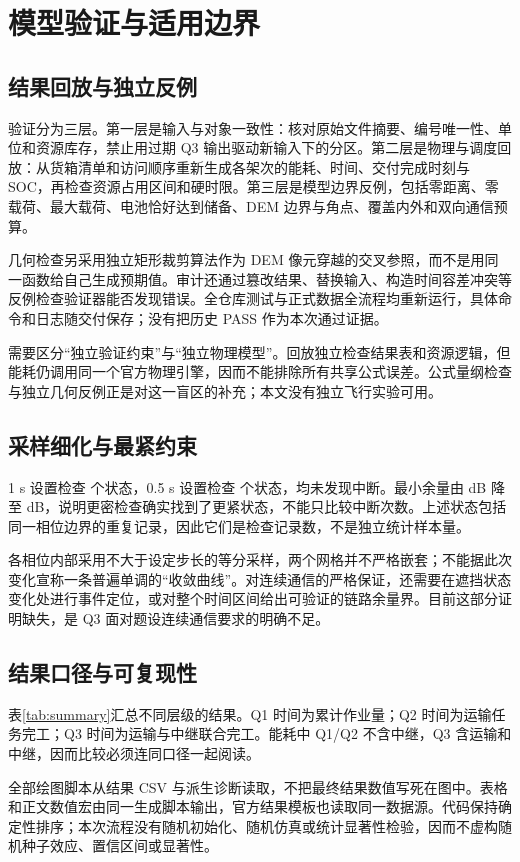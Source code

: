 \section{模型验证与适用边界}\label{sec:validation}
\subsection{结果回放与独立反例}
验证分为三层。第一层是输入与对象一致性：核对原始文件摘要、编号唯一性、单位和资源库存，禁止用过期 Q3 输出驱动新输入下的分区。第二层是物理与调度回放：从货箱清单和访问顺序重新生成各架次的能耗、时间、交付完成时刻与 SOC，再检查资源占用区间和硬时限。第三层是模型边界反例，包括零距离、零载荷、最大载荷、电池恰好达到储备、DEM 边界与角点、覆盖内外和双向通信预算。

几何检查另采用独立矩形裁剪算法作为 DEM 像元穿越的交叉参照，而不是用同一函数给自己生成预期值。审计还通过篡改结果、替换输入、构造时间容差冲突等反例检查验证器能否发现错误。全仓库测试与正式数据全流程均重新运行，具体命令和日志随交付保存；没有把历史 PASS 作为本次通过证据。

需要区分“独立验证约束”与“独立物理模型”。回放独立检查结果表和资源逻辑，但能耗仍调用同一个官方物理引擎，因而不能排除所有共享公式误差。公式量纲检查与独立几何反例正是对这一盲区的补充；本文没有独立飞行实验可用。

\subsection{采样细化与最紧约束}

1 s 设置检查 \StatesOne{} 个状态，0.5 s 设置检查 \StatesHalf{} 个状态，均未发现中断。最小余量由 \MarginOne{} dB 降至 \MarginHalf{} dB，说明更密检查确实找到了更紧状态，不能只比较中断次数。上述状态包括同一相位边界的重复记录，因此它们是检查记录数，不是独立统计样本量。

各相位内部采用不大于设定步长的等分采样，两个网格并不严格嵌套；不能据此次变化宣称一条普遍单调的“收敛曲线”。对连续通信的严格保证，还需要在遮挡状态变化处进行事件定位，或对整个时间区间给出可验证的链路余量界。目前这部分证明缺失，是 Q3 面对题设连续通信要求的明确不足。

\subsection{结果口径与可复现性}
表\ref{tab:summary}汇总不同层级的结果。Q1 时间为累计作业量；Q2 时间为运输任务完工；Q3 时间为运输与中继联合完工。能耗中 Q1/Q2 不含中继，Q3 含运输和中继，因而比较必须连同口径一起阅读。

全部绘图脚本从结果 CSV 与派生诊断读取，不把最终结果数值写死在图中。表格和正文数值宏由同一生成脚本输出，官方结果模板也读取同一数据源。代码保持确定性排序；本次流程没有随机初始化、随机仿真或统计显著性检验，因而不虚构随机种子效应、置信区间或显著性。
\FloatBarrier
